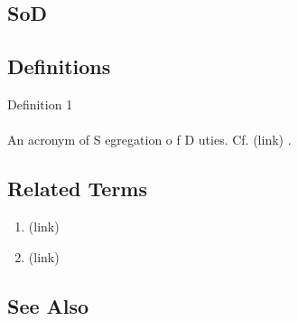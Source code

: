 \newpage \subsection*{SoD } \subsection*{Definitions } \begin{DIC_Def}{Definition 1 }{} \paragraph{} An acronym of  S  egregation  o  f  D  uties. Cf.  (link) \href{Segregation of Duties (Dictionary Entry) }{ } .  \end{DIC_Def} \subsection*{Related Terms } \begin{enumerate} \item  (link) \href{4-Eyes Principle (Dictionary Entry) }{ }   \item  (link) \href{Segregation of Duties (Dictionary Entry) }{ }   \end{enumerate} \subsection*{See Also } 